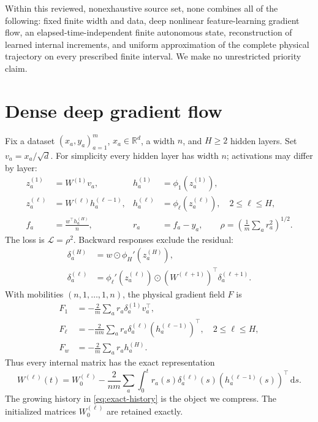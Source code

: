 \documentclass[11pt]{article}
\theoremstyle{definition}
\theoremstyle{remark}
\newcommand{\R}{\mathbb{R}}
\newcommand{\cL}{\mathcal{L}}
\newcommand{\od}{\mathbin{\odot}}
\newcommand{\dd}{\,\mathrm{d}}
\begin{document}
Within this reviewed, nonexhaustive source set, none combines all of the
following: fixed finite width and data, deep nonlinear feature-learning gradient
flow, an elapsed-time-independent finite autonomous state, reconstruction of
learned internal increments, and uniform approximation of the complete physical
trajectory on every prescribed finite interval.  We make no unrestricted
priority claim.

\section{Dense deep gradient flow}
\label{sec:dense}

Fix a dataset $(x_a,y_a)_{a=1}^m$, $x_a\in\R^d$, a width $n$, and $H\ge2$
hidden layers.  Set $v_a=x_a/\sqrt d$.  For simplicity every hidden layer has
width $n$; activations may differ by layer:
\begin{align}
 z_a^{(1)}&=W^{(1)}v_a,& h_a^{(1)}&=\phi_1(z_a^{(1)}),\nonumber\\
 z_a^{(\ell)}&=W^{(\ell)}h_a^{(\ell-1)},&
 h_a^{(\ell)}&=\phi_\ell(z_a^{(\ell)}),\quad 2\le\ell\le H,\\
 f_a&=\frac{w^\top h_a^{(H)}}{n},& r_a&=f_a-y_a,\qquad
 \rho=\left(\frac1m\sum_a r_a^2\right)^{1/2}.\nonumber
\end{align}
The loss is $\cL=\rho^2$.  Backward responses exclude the residual:
\begin{align}
 \delta_a^{(H)}&=w\od\phi_H'(z_a^{(H)}),\nonumber\\
 \delta_a^{(\ell)}&=\phi_\ell'(z_a^{(\ell)})\od
 (W^{(\ell+1)})^\top\delta_a^{(\ell+1)}.
\end{align}
With mobilities $(n,1,\ldots,1,n)$, the physical gradient field $F$ is
\begin{align}
 F_1&=-\frac2m\sum_a r_a\delta_a^{(1)}v_a^\top,\nonumber\\
 F_\ell&=-\frac{2}{nm}\sum_a r_a\delta_a^{(\ell)}
 (h_a^{(\ell-1)})^\top,\quad 2\le\ell\le H,\label{eq:dense-flow}\\
 F_w&=-\frac2m\sum_a r_a h_a^{(H)}.\nonumber
\end{align}
Thus every internal matrix has the exact representation
\begin{equation}
 W^{(\ell)}(t)=W_0^{(\ell)}-\frac{2}{nm}\sum_a
 \int_0^t r_a(s)\delta_a^{(\ell)}(s)
 (h_a^{(\ell-1)}(s))^\top\dd s.                 \label{eq:exact-history}
\end{equation}
The growing history in \eqref{eq:exact-history} is the object we compress.
The initialized matrices $W_0^{(\ell)}$ are retained exactly.
\end{document}
